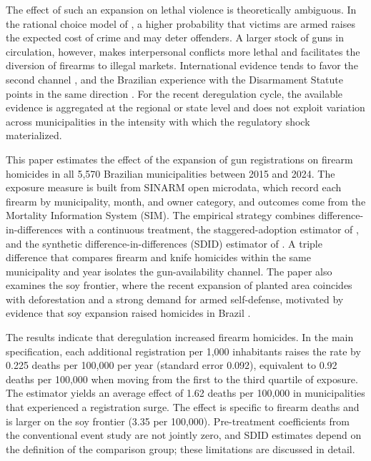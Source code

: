 \documentclass[11pt,a4paper]{article}
\begin{document}
The effect of such an expansion on lethal violence is theoretically ambiguous. In the rational choice model of \citet{becker1968}, a higher probability that victims are armed raises the expected cost of crime and may deter offenders. A larger stock of guns in circulation, however, makes interpersonal conflicts more lethal and facilitates the diversion of firearms to illegal markets. International evidence tends to favor the second channel \citep{duggan2001,cook2006}, and the Brazilian experience with the Disarmament Statute points in the same direction \citep{souza2007,cerqueira2012}. For the recent deregulation cycle, the available evidence is aggregated at the regional or state level \citep{baculi2021,wakim2025} and does not exploit variation across municipalities in the intensity with which the regulatory shock materialized.

This paper estimates the effect of the expansion of gun registrations on firearm homicides in all 5,570 Brazilian municipalities between 2015 and 2024. The exposure measure is built from SINARM open microdata, which record each firearm by municipality, month, and owner category, and outcomes come from the Mortality Information System (SIM). The empirical strategy combines difference-in-differences with a continuous treatment, the staggered-adoption estimator of \citet{callaway2021}, and the synthetic difference-in-differences (SDID) estimator of \citet{arkhangelsky2021}. A triple difference that compares firearm and knife homicides within the same municipality and year isolates the gun-availability channel. The paper also examines the soy frontier, where the recent expansion of planted area coincides with deforestation and a strong demand for armed self-defense, motivated by evidence that soy expansion raised homicides in Brazil \citep{moreno2024}.

The results indicate that deregulation increased firearm homicides. In the main specification, each additional registration per 1,000 inhabitants raises the rate by 0.225 deaths per 100,000 per year (standard error 0.092), equivalent to 0.92 deaths per 100,000 when moving from the first to the third quartile of exposure. The \citet{callaway2021} estimator yields an average effect of 1.62 deaths per 100,000 in municipalities that experienced a registration surge. The effect is specific to firearm deaths and is larger on the soy frontier (3.35 per 100,000). Pre-treatment coefficients from the conventional event study are not jointly zero, and SDID estimates depend on the definition of the comparison group; these limitations are discussed in detail.
\end{document}
